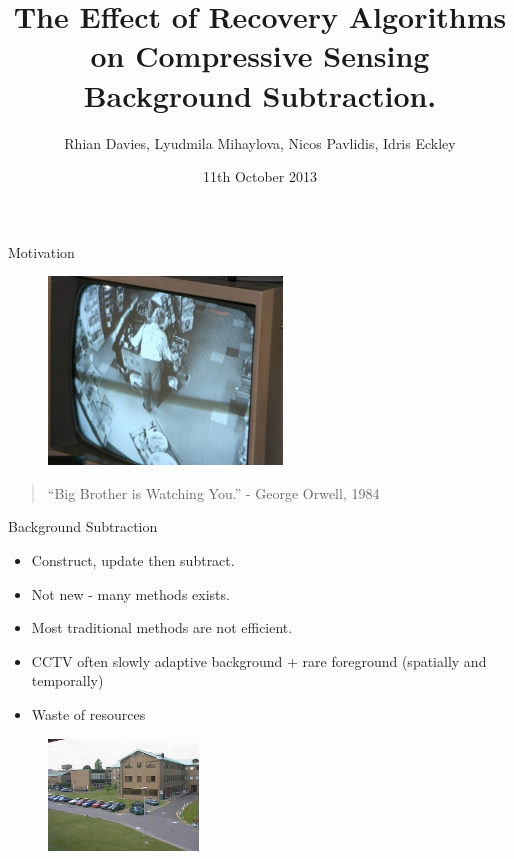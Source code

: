 \documentclass[xcolor=dvipsnames,10pt]{beamer}
\title[]{The Effect of Recovery Algorithms on Compressive Sensing Background Subtraction.}
\author[]{Rhian Davies, Lyudmila Mihaylova, Nicos Pavlidis, Idris Eckley}
\institute[]{Lancaster University}
\date{11th October 2013}
\begin{document}
\begin{frame}[plain]
  \titlepage
\end{frame}

 \begin{frame}{Motivation}
 \begin{figure}[h]
 \centering
 \includegraphics[height=5cm]{cctv}
 \label{fig:cctv}
\end{figure}  
\begin{quote}
\centering  ``Big Brother is Watching You.'' 
 \newline -  George Orwell, 1984  
\end{quote}  

 \end{frame}

\begin{frame}{Background Subtraction}
  \begin{itemize}
  \item Construct, update then subtract. 
\item Not new - many methods exists. 
\item Most traditional methods are not efficient. 
\item CCTV often slowly adaptive background + rare foreground (spatially and temporally)
\item Waste of resources
  \end{itemize}
  \begin{figure}[h]
    \centering
                \includegraphics[width=4cm]{camReal}
  \end{figure}

 \end{frame}


\end{document}
